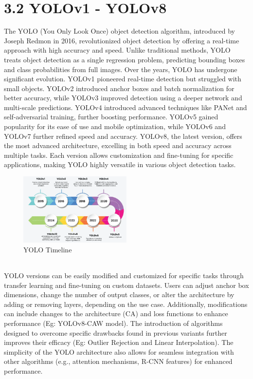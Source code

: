 \section*{3.2 YOLOv1 - YOLOv8}
The YOLO (You Only Look Once) object detection algorithm, introduced by Joseph Redmon in 2016, revolutionized object detection by offering a real-time approach with high accuracy and speed. Unlike traditional methods, YOLO treats object detection as a single regression problem, predicting bounding boxes and class probabilities from full images. Over the years, YOLO has undergone significant evolution. YOLOv1 pioneered real-time detection but struggled with small objects. YOLOv2 introduced anchor boxes and batch normalization for better accuracy, while YOLOv3 improved detection using a deeper network and multi-scale predictions. YOLOv4 introduced advanced techniques like PANet and self-adversarial training, further boosting performance. YOLOv5 gained popularity for its ease of use and mobile optimization, while YOLOv6 and YOLOv7 further refined speed and accuracy. YOLOv8, the latest version, offers the most advanced architecture, excelling in both speed and accuracy across multiple tasks. Each version allows customization and fine-tuning for specific applications, making YOLO highly versatile in various object detection tasks.
%
%
  \begin{figure}[h!]
    \centering
    \includegraphics[width=0.5\textwidth]{images/Yolo Timeline.png}
    \caption{YOLO Timeline}
    \label{fig:enter-label}
  \end{figure}\\
%
%
YOLO versions can be easily modified and customized for specific tasks through transfer learning and fine-tuning on custom datasets. Users can adjust anchor box dimensions, change the number of output classes, or alter the architecture by adding or removing layers, depending on the use case. Additionally, modifications can include changes to the architecture (CA) and loss functions to enhance performance (Eg: YOLOv8-CAW model). The introduction of algorithms designed to overcome specific drawbacks found in previous variants further improves their efficacy (Eg: Outlier Rejection and Linear Interpolation). The simplicity of the YOLO architecture also allows for seamless integration with other algorithms (e.g., attention mechanisms, R-CNN features) for enhanced performance. 
